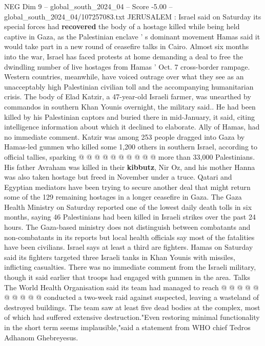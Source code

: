 \begin{textsample}{NEG Dim 9 – global\_south\_2024\_04 – Score -5.00 – global\_south\_2024\_04/107257083.txt}  \label{ex:f9_neg_325}
JERUSALEM : Israel said on Saturday its special forces had \textbf{recovered} the body of a hostage killed while being held captive in Gaza, as the Palestinian enclave ' s dominant movement Hamas said it would take part in a new round of ceasefire talks in Cairo.
Almost six months into the war, Israel has faced protests at home demanding a deal to free the dwindling number of live hostages from Hamas ' Oct. 7 cross-border rampage.
Western countries, meanwhile, have voiced outrage over what they see as an unacceptably high Palestinian civilian toll and the accompanying humanitarian crisis.
The body of Elad Katzir, a 47-year-old Israeli farmer, was unearthed by commandos in southern Khan Younis overnight, the military said..
He had been killed by his Palestinian captors and buried there in mid-January, it said, citing intelligence information about which it declined to elaborate.
Ally of Hamas, had no immediate comment.
Katzir was among 253 people dragged into Gaza by Hamas-led gunmen who killed some 1,200 others in southern Israel, according to official tallies, sparking @ @ @ @ @ @ @ @ @ @ more than 33,000 Palestinians.
His father Avraham was killed in their \textbf{kibbutz}, Nir Oz, and his mother Hanna was also taken hostage but freed in November under a truce.
Qatari and Egyptian mediators have been trying to secure another deal that might return some of the 129 remaining hostages in a longer ceasefire in Gaza.
The Gaza Health Ministry on Saturday reported one of the lowest daily death tolls in six months, saying 46 Palestinians had been killed in Israeli strikes over the past 24 hours.
The Gaza-based ministry does not distinguish between combatants and non-combatants in its reports but local health officials say most of the fatalities have been civilians.
Israel says at least a third are fighters.
Hamas on Saturday said its fighters targeted three Israeli tanks in Khan Younis with missiles, inflicting casualties.
There was no immediate comment from the Israeli military, though it said earlier that troops had engaged with gunmen in the area.
Talks The World Health Organisation said its team had managed to reach @ @ @ @ @ @ @ @ @ @ conducted a two-week raid against suspected, leaving a wasteland of destroyed buildings.
The team saw at least five dead bodies at the complex, most of which had suffered extensive destruction."Even restoring minimal functionality in the short term seems implausible,"said a statement from WHO chief Tedros Adhanom Ghebreyesus.

\end{textsample}
